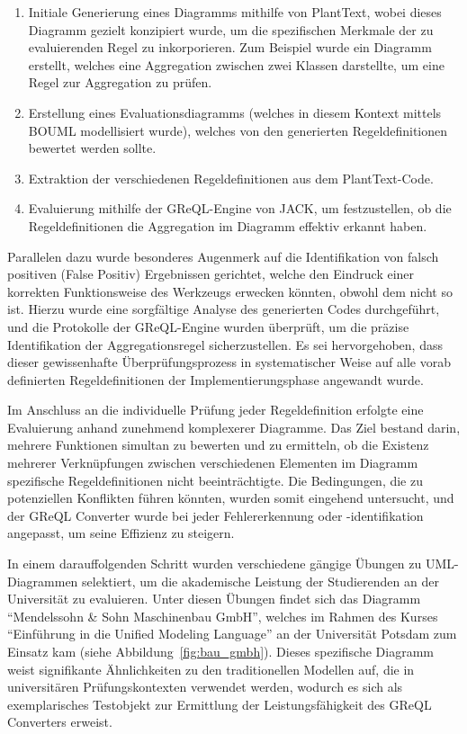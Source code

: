 \begin{enumerate}
    \item Initiale Generierung eines Diagramms mithilfe von PlantText, wobei dieses Diagramm gezielt konzipiert wurde,
um die spezifischen Merkmale der zu evaluierenden Regel zu inkorporieren. Zum Beispiel wurde ein Diagramm erstellt,
welches eine Aggregation zwischen zwei Klassen darstellte, um eine Regel zur Aggregation zu prüfen.
    \item Erstellung eines Evaluationsdiagramms (welches in diesem Kontext mittels BOUML modellisiert wurde), welches von
den generierten Regeldefinitionen bewertet werden sollte.
    \item Extraktion der verschiedenen Regeldefinitionen aus dem PlantText-Code.
    \item Evaluierung mithilfe der GReQL-Engine von JACK, um festzustellen, ob die Regeldefinitionen die Aggregation
im Diagramm effektiv erkannt haben.
\end{enumerate}

Parallelen dazu wurde besonderes Augenmerk auf die Identifikation von falsch positiven (False Positiv) Ergebnissen
gerichtet, welche den Eindruck einer korrekten Funktionsweise des Werkzeugs erwecken könnten, obwohl dem nicht so ist.
Hierzu wurde eine sorgfältige Analyse des generierten Codes durchgeführt, und die Protokolle der GReQL-Engine wurden
überprüft, um die präzise Identifikation der Aggregationsregel sicherzustellen. Es sei hervorgehoben, dass dieser
gewissenhafte Überprüfungsprozess in systematischer Weise auf alle vorab definierten Regeldefinitionen der
Implementierungsphase angewandt wurde.

Im Anschluss an die individuelle Prüfung jeder Regeldefinition erfolgte eine Evaluierung anhand zunehmend komplexerer
Diagramme. Das Ziel bestand darin, mehrere Funktionen simultan zu bewerten und zu ermitteln, ob die Existenz mehrerer
Verknüpfungen zwischen verschiedenen Elementen im Diagramm spezifische Regeldefinitionen nicht beeinträchtigte. Die
Bedingungen, die zu potenziellen Konflikten führen könnten, wurden somit eingehend untersucht, und der GReQL Converter
wurde bei jeder Fehlererkennung oder -identifikation angepasst, um seine Effizienz zu steigern.

In einem darauffolgenden Schritt wurden verschiedene gängige Übungen zu UML-Diagrammen selektiert, um die akademische
Leistung der Studierenden an der Universität zu evaluieren. Unter diesen Übungen findet sich das Diagramm ``Mendelssohn
\& Sohn Maschinenbau GmbH'', welches im Rahmen des Kurses ``Einführung in die Unified Modeling Language'' an der
Universität Potsdam zum Einsatz kam (siehe Abbildung~\ref{fig:bau_gmbh}). Dieses spezifische Diagramm weist signifikante
Ähnlichkeiten zu den traditionellen Modellen auf, die in universitären Prüfungskontexten verwendet werden, wodurch es
sich als exemplarisches Testobjekt zur Ermittlung der Leistungsfähigkeit des GReQL Converters erweist.

